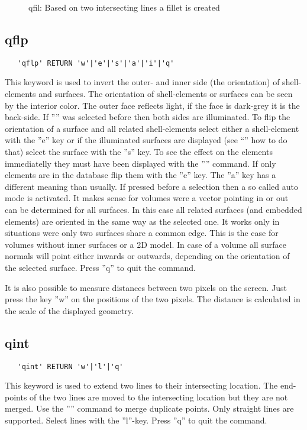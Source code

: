 \documentclass{article}
\begin{document}
\begin{figure}[h]
\caption{\label{qfilp}qfil: Based on two intersecting lines a fillet is created }
\end{figure}

\subsection{\label{qflp}qflp}
\begin{verbatim}
   'qflp' RETURN 'w'|'e'|'s'|'a'|'i'|'q'
\end{verbatim}
This keyword is used to invert the outer- and inner side (the orientation) of shell-elements and surfaces. The orientation of shell-elements or surfaces can be seen by the interior color. The outer face reflects light, if the face is dark-grey it is the back-side. If '''' was selected before then both sides are illuminated. To flip the orientation of a surface and all related shell-elements select either a shell-element with the ''e'' key or if the illuminated surfaces are displayed (see ``'' how to do that) select the surface with the ''s'' key. To see the effect on the elements immediatelly they must have been displayed with the '''' command. If only elements are in the database flip them with the ''e'' key. The ''a'' key has a different meaning than usually. If pressed before a selection then a so called auto mode is activated. It makes sense for volumes were a vector pointing in or out can be determined for all surfaces. In this case all related surfaces (and embedded elements) are oriented in the same way as the selected one. It works only in situations were only two surfaces share a common edge. This is the case for volumes without inner surfaces or a 2D model. In case of a volume all surface normals will point either inwards or outwards, depending on the orientation of the selected surface. Press ''q'' to quit the command. 

It is also possible to measure distances between two pixels on the screen. Just press the key ''w'' on the positions of the two pixels. The distance is calculated in the scale of the displayed geometry.

\subsection{\label{qint}qint}
\begin{verbatim}
   'qint' RETURN 'w'|'l'|'q'
\end{verbatim}
This keyword is used to extend two lines to their intersecting location. The end-points of the two lines are moved to the intersecting location but they are not merged. Use the '''' command to merge duplicate points. Only straight lines are supported. Select lines with the ''l''-key. Press ''q'' to quit the command.
\end{document}
